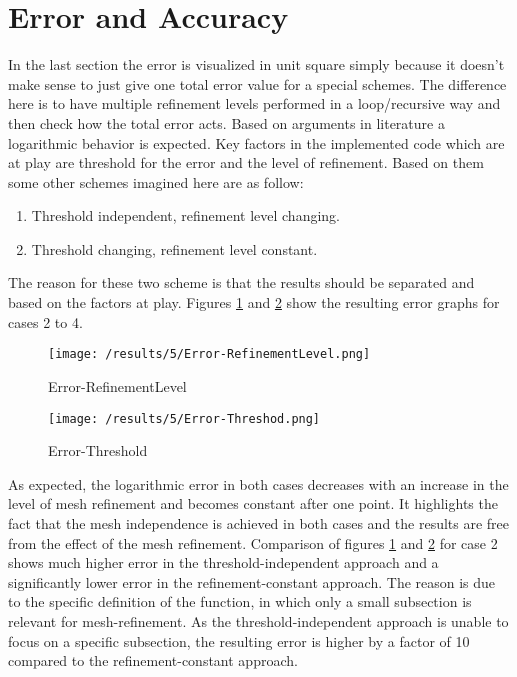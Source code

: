\section{Error and Accuracy}
In the last section the error is visualized in unit square simply because it doesn't make sense to just give one total error value for a special schemes. The difference here is to have multiple refinement levels performed in a loop/recursive way and then check how the total error acts. Based on arguments in literature a logarithmic behavior is expected. Key factors in the implemented code which are at play are threshold for the error and the level of refinement. Based on them some other schemes imagined here are as follow:
\begin{enumerate}
\item Threshold independent, refinement level changing.
\item Threshold changing, refinement level constant.
\end{enumerate}
The reason for these two scheme is that the results should be separated and based on the factors at play. Figures \ref{fig:ErrorRefinementLevel} and \ref{fig:ErrorThreshod} show the resulting error graphs for cases 2 to 4.


\begin{figure}[h]
	\centering
	    \texttt{[image: /results/5/Error-RefinementLevel.png]}
		\centering    
	 \caption{Error-RefinementLevel}
       \label{fig:ErrorRefinementLevel}
\end{figure}

\begin{figure}[h]
	\centering
	    \texttt{[image: /results/5/Error-Threshod.png]}
		\centering    
	 \caption{Error-Threshold}
       \label{fig:ErrorThreshod}
\end{figure}

As expected, the logarithmic error in both cases decreases with an increase in the level of mesh refinement and becomes constant after one point. It highlights the fact that the mesh independence is achieved in both cases and the results are free from the effect of the mesh refinement. Comparison of figures \ref{fig:ErrorRefinementLevel} and \ref{fig:ErrorThreshod} for case 2 shows much higher error in the threshold-independent approach and a significantly lower error in the refinement-constant approach. The reason is due to the specific definition of the function, in which only a small subsection is relevant for mesh-refinement. As the threshold-independent approach is unable to focus on a specific subsection, the resulting error is higher by a factor of 10 compared to the refinement-constant approach.





